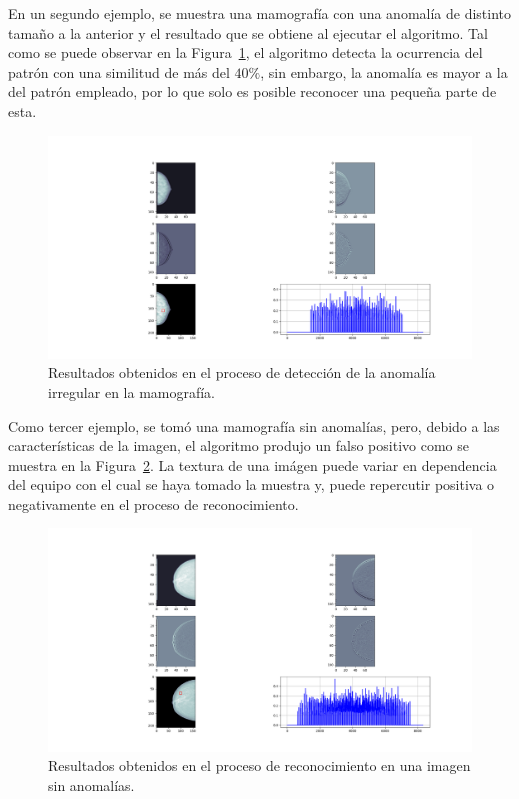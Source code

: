 \par En un segundo ejemplo, se muestra una mamograf\'ia con una anomal\'ia de distinto tama\~no a la anterior y el resultado que se obtiene al ejecutar el algoritmo. Tal como se puede observar en la Figura~\ref{detect-anomalia-piece}, el algoritmo detecta la ocurrencia del patr\'on con una similitud de m\'as del $40\%$, sin embargo, la anomal\'ia es mayor a la del patr\'on empleado, por lo que solo es posible reconocer una peque\~na parte de esta.

\begin{figure}[h]
\center
\includegraphics[scale=.32]{Graphics/MamografiaDetectPiece.png}
\caption{Resultados obtenidos en el proceso de detecci\'on de la anomal\'ia irregular en la mamograf\'ia.}
\label{detect-anomalia-piece}
\end{figure}

\par Como tercer ejemplo, se tom\'o una mamograf\'ia sin anomal\'ias, pero, debido a las caracter\'isticas de la imagen, el algoritmo produjo un falso positivo como se muestra en la Figura~\ref{detect-anomalia-fail}. La textura de una im\'agen puede variar en dependencia del equipo con el cual se haya tomado la muestra y, puede repercutir positiva o negativamente en el proceso de reconocimiento.

\begin{figure}[h]
\center
\includegraphics[scale=.32]{Graphics/MamografiaDetectFail.png}
\caption{Resultados obtenidos en el proceso de reconocimiento en una imagen sin anomal\'ias.}
\label{detect-anomalia-fail}
\end{figure}

